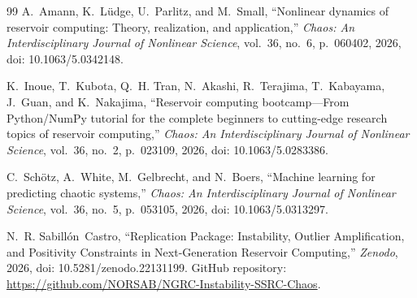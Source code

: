 \documentclass[aip,cha,reprint,amsmath,amssymb]{revtex4-2}
\begin{document}
\begin{thebibliography}{99}
A.~Amann, K.~L{\"u}dge, U.~Parlitz, and M.~Small, ``Nonlinear dynamics of reservoir computing: Theory, realization, and application,'' \emph{Chaos: An Interdisciplinary Journal of Nonlinear Science}, vol.~36, no.~6, p.~060402, 2026, doi: 10.1063/5.0342148.

K.~Inoue, T.~Kubota, Q.~H. Tran, N.~Akashi, R.~Terajima, T.~Kabayama, J.~Guan, and K.~Nakajima, ``Reservoir computing bootcamp---From Python/NumPy tutorial for the complete beginners to cutting-edge research topics of reservoir computing,'' \emph{Chaos: An Interdisciplinary Journal of Nonlinear Science}, vol.~36, no.~2, p.~023109, 2026, doi: 10.1063/5.0283386.

C.~Sch{\"o}tz, A.~White, M.~Gelbrecht, and N.~Boers, ``Machine learning for predicting chaotic systems,'' \emph{Chaos: An Interdisciplinary Journal of Nonlinear Science}, vol.~36, no.~5, p.~053105, 2026, doi: 10.1063/5.0313297.

N.~R. Sabill{\'o}n~Castro, ``Replication Package: Instability, Outlier Amplification, and Positivity Constraints in Next-Generation Reservoir Computing,'' \emph{Zenodo}, 2026, doi: 10.5281/zenodo.22131199. GitHub repository: \url{https://github.com/NORSAB/NGRC-Instability-SSRC-Chaos}.

\end{thebibliography}
\end{document}
